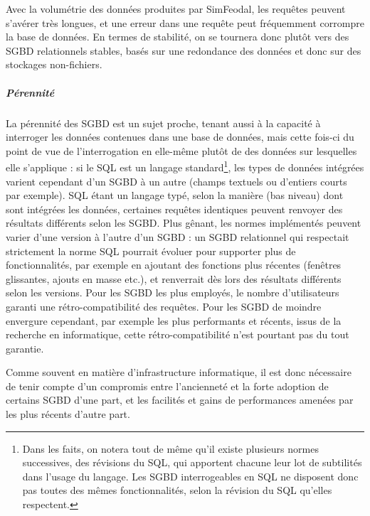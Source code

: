 		Avec la volumétrie des données produites par SimFeodal, les requêtes peuvent s'avérer très longues, et une erreur dans une requête peut fréquemment corrompre la base de données.
		En termes de stabilité, on se tournera donc plutôt vers des SGBD relationnels stables, basés sur une redondance des données et donc sur des stockages non-fichiers.

		\subparagraph{Pérennité}
		La pérennité des SGBD est un sujet proche, tenant aussi à la capacité à interroger les données contenues dans une base de données, mais cette fois-ci du point de vue de l'interrogation en elle-même plutôt de des données sur lesquelles elle s'applique :
		si le SQL est un langage standard\footnote{
		Dans les faits, on notera tout de même qu'il existe plusieurs normes successives, des \og révisions\fg{} du SQL, qui apportent chacune leur lot de subtilités dans l'usage du langage. Les SGBD interrogeables en SQL ne disposent donc pas toutes des mêmes fonctionnalités, selon la révision du SQL qu'elles respectent.
		}, les types de données intégrées varient cependant d'un SGBD à un autre (champs textuels ou d'entiers \og courts\fg{} par exemple).
		SQL étant un langage typé, selon la manière (bas niveau) dont sont intégrées les données, certaines requêtes identiques peuvent renvoyer des résultats différents selon les SGBD.
		Plus gênant, les normes implémentés peuvent varier d'une version à l'autre d'un SGBD : un SGBD relationnel qui respectait strictement la norme SQL pourrait évoluer pour supporter plus de fonctionnalités, par exemple en ajoutant des fonctions plus récentes (fenêtres glissantes, ajouts en masse etc.), et renverrait dès lors des résultats différents selon les versions.
		Pour les SGBD les plus employés, le nombre d'utilisateurs garanti une rétro-compatibilité des requêtes.
		Pour les SGBD de moindre envergure cependant, par exemple les plus performants et récents, issus de la recherche en informatique, cette rétro-compatibilité n'est pourtant pas du tout garantie.

		Comme souvent en matière d'infrastructure informatique, il est donc nécessaire de tenir compte d'un compromis entre l'ancienneté et la forte adoption de certains SGBD d'une part, et les facilités et gains de performances amenées par les plus récents d'autre part.

